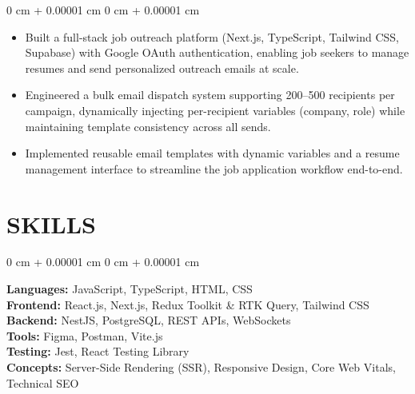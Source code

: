 \documentclass[10pt, letterpaper]{article}
\newenvironment{highlights}{
    \begin{itemize}[
        topsep=0.10 cm,
        parsep=0.10 cm,
        partopsep=0pt,
        itemsep=0pt,
        leftmargin=0 cm + 10pt
    ]
}{
    \end{itemize}
} %
\newenvironment{onecolentry}{
    \begin{adjustwidth}{
        0 cm + 0.00001 cm
    }{
        0 cm + 0.00001 cm
    }
}{
    \end{adjustwidth}
} %
\begin{document}
\vspace{0.10 cm}
\begin{onecolentry}
    \begin{highlights}
        \item Built a full-stack job outreach platform (Next.js, TypeScript, Tailwind CSS, Supabase) with Google OAuth authentication, enabling job seekers to manage resumes and send personalized outreach emails at scale.
        \item Engineered a bulk email dispatch system supporting 200–500 recipients per campaign, dynamically injecting per-recipient variables (company, role) while maintaining template consistency across all sends.
        \item Implemented reusable email templates with dynamic variables and a resume management interface to streamline the job application workflow end-to-end.
    \end{highlights}
\end{onecolentry}

\section{SKILLS}
\begin{onecolentry}
    \textbf{Languages:} JavaScript, TypeScript, HTML, CSS \\
    \textbf{Frontend:} React.js, Next.js, Redux Toolkit \& RTK Query, Tailwind CSS \\
    \textbf{Backend:} NestJS, PostgreSQL, REST APIs, WebSockets \\
    \textbf{Tools:} Figma, Postman, Vite.js \\
    \textbf{Testing:} Jest, React Testing Library \\
    \textbf{Concepts:} Server-Side Rendering (SSR), Responsive Design, Core Web Vitals, Technical SEO \\
\end{onecolentry}
\end{document}
